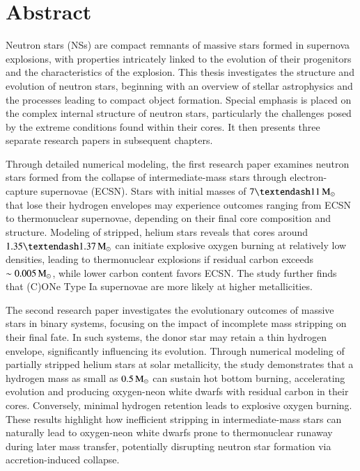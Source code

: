 \documentclass[main.tex]{subfiles}
\begin{document}
    \chapter*{Abstract}
    Neutron stars (NSs) are compact remnants of massive stars formed in supernova explosions, with properties intricately linked to the evolution of their progenitors and the characteristics of the explosion. This thesis investigates the structure and evolution of neutron stars, beginning with an overview of stellar astrophysics and the processes leading to compact object formation. Special emphasis is placed on the complex internal structure of neutron stars, particularly the challenges posed by the extreme conditions found within their cores. It then presents three separate research papers in subsequent chapters.

    Through detailed numerical modeling, the first research paper examines neutron stars formed from the collapse of intermediate-mass stars through electron-capture supernovae (ECSN). Stars with initial masses of $7–11\msun$ that lose their hydrogen envelopes may experience outcomes ranging from ECSN to thermonuclear supernovae, depending on their final core composition and structure. Modeling of stripped, helium stars reveals that cores around $1.35–1.37\msun$ can initiate explosive oxygen burning at relatively low densities, leading to thermonuclear explosions if residual carbon exceeds $\sim 0.005\mathrm{\,M_\odot}$, while lower carbon content favors ECSN. The study further finds that (C)ONe Type Ia supernovae are more likely at higher metallicities.

    The second research paper investigates the evolutionary outcomes of massive stars in binary systems, focusing on the impact of incomplete mass stripping on their final fate. In such systems, the donor star may retain a thin hydrogen envelope, significantly influencing its evolution. Through numerical modeling of partially stripped helium stars at solar metallicity, the study demonstrates that a hydrogen mass as small as $0.5\mathrm{\,M_\odot}$ can sustain hot bottom burning, accelerating evolution and producing oxygen-neon white dwarfs with residual carbon in their cores. Conversely, minimal hydrogen retention leads to explosive oxygen burning. These results highlight how inefficient stripping in intermediate-mass stars can naturally lead to oxygen-neon white dwarfs prone to thermonuclear runaway during later mass transfer, potentially disrupting neutron star formation via accretion-induced collapse.
\end{document}
